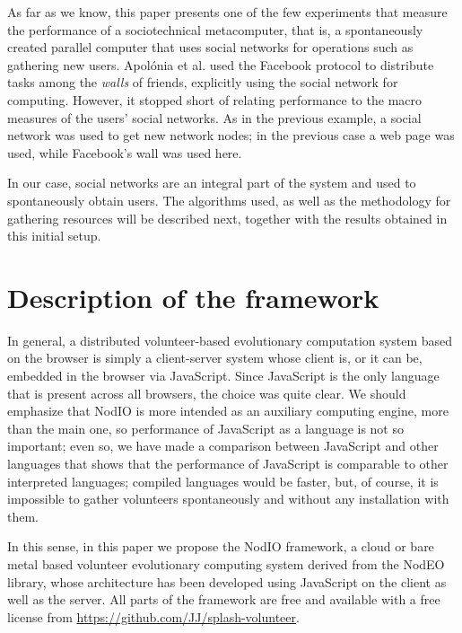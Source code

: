 \documentclass[letterpaper]{article}
\begin{document}
As far as we know, this paper presents one of the few experiments
that measure the performance of a sociotechnical
metacomputer, that is, a spontaneously created parallel computer that
uses social networks for operations such as gathering new
users. Apol{\'o}nia et al. \citep{apolonia2012enhancing} used the 
Facebook protocol to distribute tasks among the {\em walls} of
friends, explicitly using the social network for computing. However,
it stopped short of relating performance to the macro measures of the
users' social networks. As in the previous example, a social network
was used to get new network nodes; in the previous case a web page was
used, while Facebook's wall was used here.

In our case, social networks are an integral part of the system and
used to spontaneously obtain users. The algorithms used, as well as the methodology 
for gathering resources will be described next, 
together with the results obtained in this initial setup.


\section{Description of the framework}
\label{sec:description}

In general, a distributed volunteer-based evolutionary computation
system based on the browser is simply a client-server system
whose client is, or it can be, embedded in the browser via
JavaScript. Since JavaScript is  the only language that is present
across all browsers, the choice was quite clear. We should emphasize
that NodIO is more intended as an auxiliary computing engine, more
than the main one, so performance of JavaScript as a language is not
so important; even so, we have made a comparison between JavaScript and other languages
\citep{2015arXiv151101088M} that shows that the performance of JavaScript
is comparable to other interpreted languages; compiled languages would
be faster, but, of course, it is impossible to gather volunteers
spontaneously and without any installation with them.

In this sense, in this paper we propose the {\sf NodIO} framework, a
cloud or bare metal based volunteer evolutionary computing system
derived from the {\sf NodEO} library, whose architecture has been
developed using JavaScript on the client as well as the server.
All parts of the framework are free and available with a free license
from \url{https://github.com/JJ/splash-volunteer}.
\end{document}
